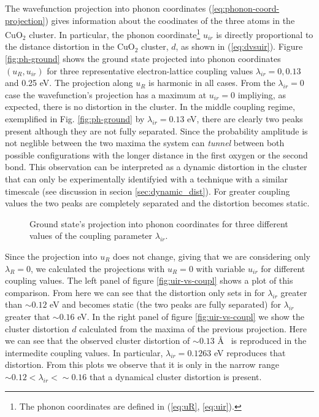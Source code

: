The wavefunction projection into phonon coordinates (\ref{eq:phonon-coord-projection}) gives information about the coodinates of the three atoms in the CuO$_2$ cluster.
In particular, the phonon coordinate\footnote{The phonon coordinates are  defined in (\ref{eq:uR}, \ref{eq:uir}).} $u_{ir}$ is directly proportional to the distance distortion in the CuO$_2$ cluster, $d$, as shown in (\ref{eq:dvsuir}).
Figure \ref{fig:ph-ground} shows the ground state projected into phonon coordinates $(u_R,u_{ir})$ for three representative electron-lattice coupling values $\lambda_{ir}=0, 0.13$ and 0.25 eV.
The projection along $u_R$ is harmonic in all cases.
From the $\lambda_{ir}=0$ case the wavefunction's projection has a maximum at $u_{ir}=0$ impliying, as expected, there is no distortion in the cluster.
In the middle coupling regime, exemplified in Fig. \ref{fig:ph-ground} by $\lambda_{ir}=0.13$ eV, there are clearly two peaks present although they are not fully separated.
Since the probability amplitude is not neglible between the two maxima the system can \textit{tunnel} between both possible configurations with the longer distance in the first oxygen or the second bond.
This observation can be interpreted as a dynamic distortion in the cluster that can only be experimentally identifyied with a technique with a similar timescale (see discussion in secion \ref{sec:dynamic_dist}). 
For greater coupling values the two peaks are completely separated and the distortion becomes static.

\begin{figure}[ht!]
  \centering
  
  \caption{Ground state's projection into phonon coordinates for three different values of the coupling parameter $\lambda_{ir}$.}
  \label{fig:phononProjGrd}
\end{figure}

Since the projection into $u_R$ does not change, giving that we are considering only $\lambda_R=0$, we calculated the projections with $u_R=0$ with variable $u_{ir}$ for different coupling values.
The left panel of figure \ref{fig:uir-vs-coupl} shows a plot of this comparison.
From here we can see that the distortion only sets in for $\lambda_{ir}$ greater than $\sim 0.12$ eV and becomes static (the two peaks are fully separated) for $\lambda_{ir}$ greater that $\sim 0.16$ eV.
In the right panel of figure \ref{fig:uir-vs-coupl} we show the cluster distortion $d$ calculated from the maxima of the previous projection.
Here we can see that the observed cluster distortion of $\sim 0.13$ \AA\ \cite{MustredeLeon1990} is reproduced in the intermedite coupling values. 
In particular, $\lambda_{ir}=0.1263$ eV reproduces that distortion.
From this plots we observe that it is only in the narrow range  $\sim 0.12 < \lambda_{ir} < \sim 0.16$ that a dynamical cluster distortion is present. 

